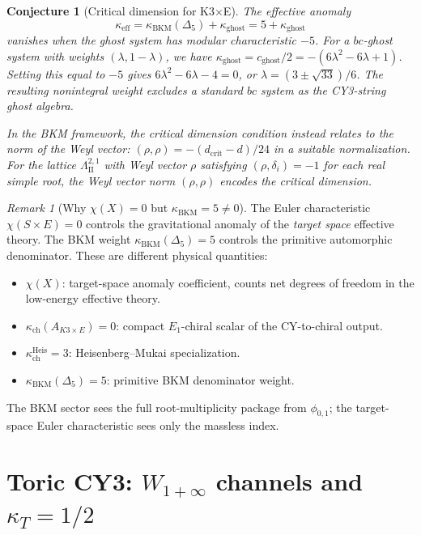 \documentclass[11pt]{article}
\newtheorem{conjecture}[theorem]{Conjecture}
\theoremstyle{definition}
\theoremstyle{remark}
\newtheorem{remark}[theorem]{Remark}
\begin{document}
\begin{conjecture}[Critical dimension for K3$\times$E]
\label{conj:k3e-critical}
The effective anomaly
\[
 \kappa_{\mathrm{eff}}
 = \kappa_{\mathrm{BKM}}(\Delta_5) + \kappa_{\mathrm{ghost}}
 = 5 + \kappa_{\mathrm{ghost}}
\]
vanishes when the ghost system has modular characteristic $-5$. For a
$bc$-ghost system with weights $(\lambda, 1-\lambda)$, we have
$\kappa_{\mathrm{ghost}} = c_{\mathrm{ghost}}/2 = -(6\lambda^2 - 6\lambda + 1)$.
Setting this equal to $-5$ gives $6\lambda^2 - 6\lambda - 4 = 0$, or
$\lambda = (3 \pm \sqrt{33})/6$. The resulting nonintegral weight
excludes a standard $bc$ system as the CY3-string ghost algebra.

In the BKM framework, the critical dimension condition instead relates
to the norm of the Weyl vector:
$(\rho, \rho) = -(d_{\mathrm{crit}} - d)/24$ in a suitable normalization.
For the lattice $\Lambda^{2,1}_{\mathrm{II}}$ with Weyl vector
$\rho$ satisfying $(\rho, \delta_i) = -1$ for each real simple root, the
Weyl vector norm $(\rho, \rho)$ encodes the critical dimension.
\end{conjecture}

\begin{remark}[Why $\chi(X) = 0$ but $\kappa_{\mathrm{BKM}} = 5 \neq 0$]
\label{rem:chi-vs-bkm-weight-k3e}
The Euler characteristic $\chi(S \times E) = 0$ controls the
gravitational anomaly of the \emph{target space} effective theory. The
BKM weight $\kappa_{\mathrm{BKM}}(\Delta_5)=5$ controls the primitive
automorphic denominator. These are different physical quantities:
\begin{itemize}
\item $\chi(X)$: target-space anomaly coefficient, counts net degrees
 of freedom in the low-energy effective theory.
\item $\kappa_{\mathrm{ch}}(A_{K3\times E})=0$: compact $E_1$-chiral
 scalar of the CY-to-chiral output.
\item $\kappa_{\mathrm{ch}}^{\mathrm{Heis}}=3$: Heisenberg--Mukai
 specialization.
\item $\kappa_{\mathrm{BKM}}(\Delta_5)=5$: primitive BKM denominator
 weight.
\end{itemize}
The BKM sector sees the full root-multiplicity package from
$\phi_{0,1}$; the target-space Euler characteristic sees only the
massless index.
\end{remark}


\section{Toric CY3: $W_{1+\infty}$ channels and $\kappa_T = 1/2$}
\label{sec:toric}
\end{document}
